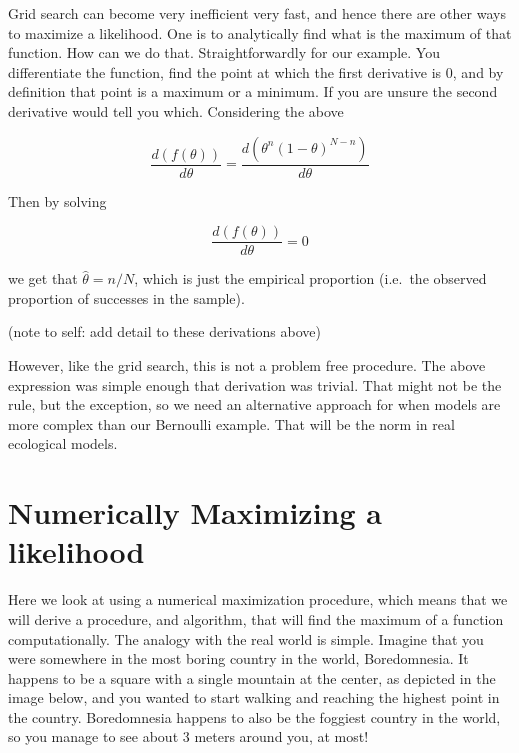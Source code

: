 \documentclass[
]{book}
\begin{document}
Grid search can become very inefficient very fast, and hence there are other ways to maximize a likelihood. One is to analytically find what is the maximum of that function. How can we do that. Straightforwardly for our example. You differentiate the function, find the point at which the first derivative is 0, and by definition that point is a maximum or a minimum. If you are unsure the second derivative would tell you which. Considering the above

\[\frac{d(f(\theta))}{d \theta}=\frac{d(\theta^n (1-\theta)^{N-n})}{d \theta}\]

Then by solving

\[\frac{d(f(\theta))}{d \theta}=0\]

we get that \(\hat \theta = n/N\), which is just the empirical proportion (i.e.~the observed proportion of successes in the sample).

(note to self: add detail to these derivations above)

However, like the grid search, this is not a problem free procedure. The above expression was simple enough that derivation was trivial. That might not be the rule, but the exception, so we need an alternative approach for when models are more complex than our Bernoulli example. That will be the norm in real ecological models.

\hypertarget{numerically-maximizing-a-likelihood}{%
\section{Numerically Maximizing a likelihood}\label{numerically-maximizing-a-likelihood}}

Here we look at using a numerical maximization procedure, which means that we will derive a procedure, and algorithm, that will find the maximum of a function computationally. The analogy with the real world is simple. Imagine that you were somewhere in the most boring country in the world, Boredomnesia. It happens to be a square with a single mountain at the center, as depicted in the image below, and you wanted to start walking and reaching the highest point in the country. Boredomnesia happens to also be the foggiest country in the world, so you manage to see about 3 meters around you, at most!
\end{document}
